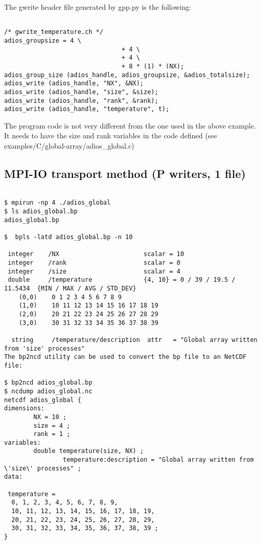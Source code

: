 The gwrite header file generated by gpp.py is the following:

\begin{lstlisting}[alsolanguage=C,caption=gwrite header file generated from
  config.xml]

/* gwrite_temperature.ch */
adios_groupsize = 4 \
                                + 4 \
                                + 4 \
                                + 8 * (1) * (NX);
adios_group_size (adios_handle, adios_groupsize, &adios_totalsize);
adios_write (adios_handle, "NX", &NX);
adios_write (adios_handle, "size", &size);
adios_write (adios_handle, "rank", &rank);
adios_write (adios_handle, "temperature", t);

\end{lstlisting}

The program code is not very different from the one used in the above example. 
It needs to have the size and rank variables in the code defined (see examples/C/global-array/adios\_global.c) 

\subsection{MPI-IO transport method (P writers, 1 file)}

\begin{lstlisting}

$ mpirun -np 4 ./adios_global
$ ls adios_global.bp 
adios_global.bp

$  bpls -latd adios_global.bp -n 10
  
 integer    /NX                       scalar = 10
 integer    /rank                     scalar = 0
 integer    /size                     scalar = 4
 double     /temperature              {4, 10} = 0 / 39 / 19.5 / 11.5434  {MIN / MAX / AVG / STD_DEV}
    (0,0)    0 1 2 3 4 5 6 7 8 9
    (1,0)    10 11 12 13 14 15 16 17 18 19
    (2,0)    20 21 22 23 24 25 26 27 28 29
    (3,0)    30 31 32 33 34 35 36 37 38 39

  string     /temperature/description  attr   = "Global array written from 'size' processes"
The bp2ncd utility can be used to convert the bp file to an NetCDF file:

$ bp2ncd adios_global.bp
$ ncdump adios_global.nc 
netcdf adios_global {
dimensions:
        NX = 10 ;
        size = 4 ;
        rank = 1 ;
variables:
        double temperature(size, NX) ;
                temperature:description = "Global array written from \'size\' processes" ;
data:

 temperature =
  0, 1, 2, 3, 4, 5, 6, 7, 8, 9,
  10, 11, 12, 13, 14, 15, 16, 17, 18, 19,
  20, 21, 22, 23, 24, 25, 26, 27, 28, 29,
  30, 31, 32, 33, 34, 35, 36, 37, 38, 39 ;
}
\end{lstlisting}

